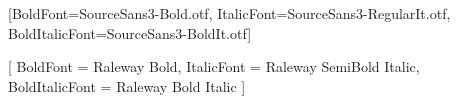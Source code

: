 
\usepackage{fontspec}

\setmainfont{Latin Modern Roman}
\setsansfont{SourceSans3-Regular.otf}[BoldFont=SourceSans3-Bold.otf,
  ItalicFont=SourceSans3-RegularIt.otf, BoldItalicFont=SourceSans3-BoldIt.otf]
\renewcommand{\familydefault}{\sfdefault}

\newfontfamily{}
\newfontfamily{}[
  BoldFont       = {Raleway Bold},
  ItalicFont     = {Raleway SemiBold Italic},
  BoldItalicFont = {Raleway Bold Italic}
]

\newfontfamily{}

\newfontfamily{}

\newfontfamily{}

